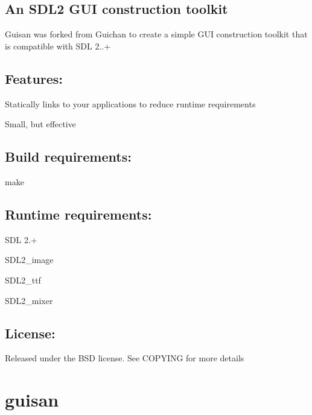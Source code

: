 

\subsection*{An S\+D\+L2 G\+UI construction toolkit}

\href{https://travis-ci.org/gbaudic/guisan}{\tt }

Guisan was forked from Guichan to create a simple G\+UI construction toolkit that is compatible with S\+DL 2..+

\subsection*{Features\+:}


\begin{DoxyItemize}
\item Statically links to your applications to reduce runtime requirements
\item Small, but effective
\end{DoxyItemize}

\subsection*{Build requirements\+:}


\begin{DoxyItemize}
\item make
\end{DoxyItemize}

\subsection*{Runtime requirements\+:}


\begin{DoxyItemize}
\item S\+DL 2.+
\item S\+D\+L2\+\_\+image
\item S\+D\+L2\+\_\+ttf
\item S\+D\+L2\+\_\+mixer
\end{DoxyItemize}

\subsection*{License\+:}

Released under the B\+SD license. See C\+O\+P\+Y\+I\+NG for more details \section*{guisan}